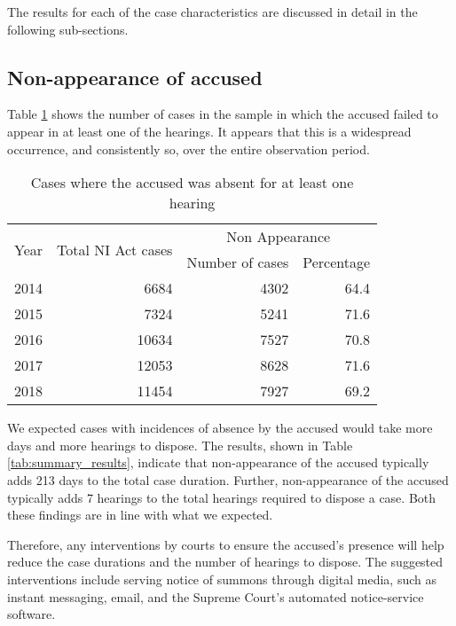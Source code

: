 The results for each of the case characteristics are discussed in detail in the following sub-sections.

\subsection{Non-appearance of accused}
\label{sec:non-appe-accus-1}

Table \ref{tab:nonAppearance_yearWise} shows the number of cases in the sample in which the accused failed to appear in at least one of the hearings. It appears that this is a widespread occurrence, and consistently so, over the entire observation period.

\begin{longtable}[h!]{@{}lrrr@{}}
 \caption{Cases where the accused was absent for at least one hearing}\label{tab:nonAppearance_yearWise}\\
\toprule
\multirow{2}{*}{Year} &  \multirow{2}{*}{Total NI Act cases} & \multicolumn{2}{c}{Non Appearance}\\
\cmidrule{3-4}
&& Number of cases & Percentage \\
\midrule\endhead
2014 & 6684 & 4302 & 64.4 \\
2015 & 7324 & 5241 & 71.6 \\
2016 & 10634 & 7527 & 70.8 \\
2017 & 12053 & 8628 & 71.6 \\
2018 & 11454 & 7927 & 69.2 \\
\bottomrule
\end{longtable}

We expected cases with incidences of absence by the accused would take more days and more hearings to dispose. The results, shown in Table \ref{tab:summary_results}, indicate that non-appearance of the accused typically adds 213 days to the total case duration. Further, non-appearance of the accused typically adds 7 hearings to the total hearings required to dispose a case. Both these findings are in line with what we expected.

Therefore, any interventions by courts to ensure the accused's presence will help reduce the case durations and the number of hearings to dispose. The suggested interventions include serving notice of summons through digital media, such as instant messaging, email, and the Supreme Court's automated notice-service software.

